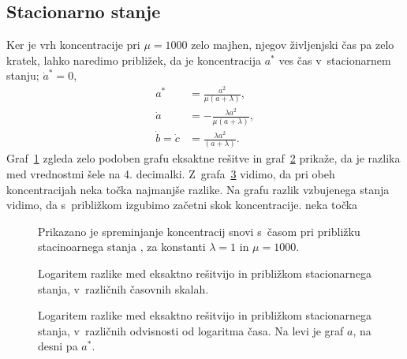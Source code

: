 \documentclass[a4paper,pdftex,12pt]{article}
\numberwithin{figure}{section} %
\begin{document}
\subsection{Stacionarno stanje}
Ker je vrh koncentracije  pri $\mu=1000$ zelo majhen, njegov življenjski čas pa zelo
kratek, lahko naredimo približek, da je koncentracija $a^*$ ves čas v~stacionarnem stanju;
$\dot{a}^* = 0$,
\begin{align}\label{binarna3}
    a^* &= \frac{a^2}{\mu \left( a + \lambda \right) }, \\
    \dot{a} &= - \frac{\lambda a^2}{\mu \left( a + \lambda \right)}, \\
    \dot{b} = \dot{c} &= \frac{\lambda a^2}{\left( a + \lambda \right) }.
\end{align}
Graf~\ref{slika4} zgleda zelo podoben grafu eksaktne rešitve in graf~\ref{slika5} prikaže,
da je razlika med vrednostmi šele na 4. decimalki. Z~grafa~\ref{slika6} vidimo, da pri
obeh koncentracijah neka točka najmanjše razlike. Na grafu razlik vzbujenega stanja
vidimo, da s~približkom izgubimo začetni skok koncentracije.
neka točka 
\begin{figure}    
    \resizebox{0.9\linewidth}{!}{}
    \caption{Prikazano je spreminjanje koncentracij snovi s~časom pri približku 
    stacinoarnega stanja , za konstanti $\lambda = 1$ in $\mu = 1000$.}
    \label{slika4}
\end{figure}
\begin{figure}    
    \hspace{1cm}\resizebox{0.9\linewidth}{!}{}
    \caption{Logaritem razlike med eksaktno rešitvijo in približkom stacionarnega stanja,
    v~različnih časovnih skalah.}
    \label{slika5}
\end{figure}
\begin{figure}    
    \hspace{1cm}\resizebox{0.9\linewidth}{!}{}
    \caption{Logaritem razlike med eksaktno rešitvijo in približkom stacionarnega stanja,
    v~različnih odvisnosti od logaritma časa. Na levi je graf $a$, na desni pa $a^*$.}
    \label{slika6}
\end{figure}

\end{document}
